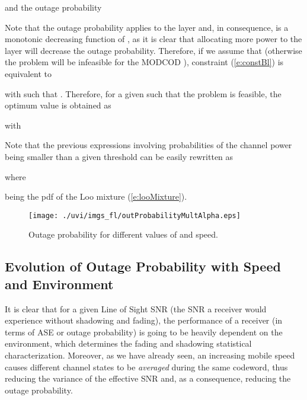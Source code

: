\documentclass[journal,onecolumn,10pt,a4paper]{IEEEtran}
\begin{document}
and the outage probability

Note that the outage probability applies to the  layer and, in consequence,  is a monotonic decreasing function of , as it is clear that allocating more power to the  layer will decrease the outage probability. Therefore, if we assume that  (otherwise the problem will be infeasible for the MODCOD ), constraint (\ref{e:constBl}) is equivalent to

with  such that . Therefore, for a given  such that the problem is feasible, the optimum value  is obtained as

with


Note that the previous expressions involving probabilities of the channel power  being smaller than a given threshold  can be easily rewritten as

where

being  the pdf of the Loo mixture (\ref{e:looMixture}).





 







\begin{figure}
\begin{center}

 \texttt{[image: ./uvi/imgs\_fl/outProbabilityMultAlpha.eps]}
\caption{Outage probability for different values of  and speed.}

\label{outProbabilityMultAlpha}\end{center}
\end{figure}





\subsection{Evolution of Outage Probability with Speed and Environment}
It is clear that for a given Line of Sight SNR (the SNR a receiver would experience without shadowing and fading), the performance of a receiver (in terms of ASE or outage probability) is going to be heavily dependent on the environment, which determines the fading and shadowing statistical characterization. Moreover, as we have already seen, an increasing mobile speed causes different channel states to be \textit{averaged} during the same codeword, thus reducing the variance of the effective SNR and, as a consequence, reducing the outage probability.
\end{document}
